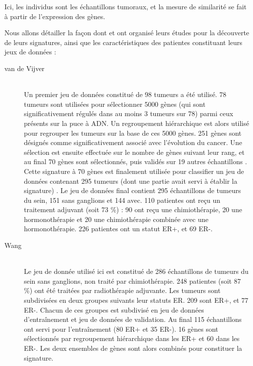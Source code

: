 			Ici, les individus sont les échantillons tumoraux, et la mesure de similarité se fait à partir de l'expression des gènes.

			Nous allons détailler la façon dont \citeauthor{vandevijver2002} et \citeauthor{Wang2005} ont organisé leurs études pour la découverte de leurs signatures, ainsi que les caractéristiques des patientes constituant leurs jeux de données :
			\begin{description}
				\item [van de Vijver \citep{vandevijver2002}] \hfill \\
					Un premier jeu de données constitué de 98 tumeurs a été utilisé.
					78 tumeurs sont utilisées pour sélectionner 5000 gènes (qui sont significativement régulés dans au moins 3 tumeurs sur 78) parmi ceux présents sur la puce à \acs{ADN}.
					Un regroupement hiérarchique est alors utilisé pour regrouper les tumeurs sur la base de ces 5000 gènes.
					251 gènes sont désignés comme significativement associé avec l'évolution du cancer.
					Une sélection est ensuite effectuée sur le nombre de gènes suivant leur rang, et au final 70 gènes sont sélectionnés, puis validés sur 19 autres échantillons \citep{vantveer2002}.
					Cette signature à 70 gènes est finalement utilisée pour classifier un jeu de données contenant 295 tumeurs (dont une partie avait servi à établir la signature) \citep{vandevijver2002}.
					Le jeu de données final contient 295 échantillons de tumeurs du sein, 151 sans ganglions et 144 avec.
					110 patientes ont reçu un traitement adjuvant (soit 73 \%) : 90 ont reçu une chimiothérapie, 20 une hormonothérapie et 20 une chimiothérapie combinée avec une hormonothérapie.
					226 patientes ont un statut \acs{ER+}, et 69 \acs{ER-}.
				\item [Wang \citep{Wang2005}]                  \hfill \\
					Le jeu de donnée utilisé ici est constitué de 286 échantillons de tumeurs du sein sans ganglions, non traité par chimiothérapie.
					248 patientes (soit 87 \%) ont été traitées par radiothérapie adjuvante.
					Les tumeurs sont subdivisées en deux groupes suivants leur statuts \acs{ER}.
					209 sont \acs{ER+}, et 77 \acs{ER-}.
					Chacun de ces groupes est subdivisé en jeu de données d'entraînement et jeu de données de validation.
					Au final 115 échantillons ont servi pour l'entraînement (80 \acs{ER+} et 35 \acs{ER-}).
					16 gènes sont sélectionnés par regroupement hiérarchique dans les \acs{ER+} et 60 dans les \acs{ER-}.
					Les deux ensembles de gènes sont alors combinés pour constituer la signature.
			\end{description}
			\vspace{1.5ex}

